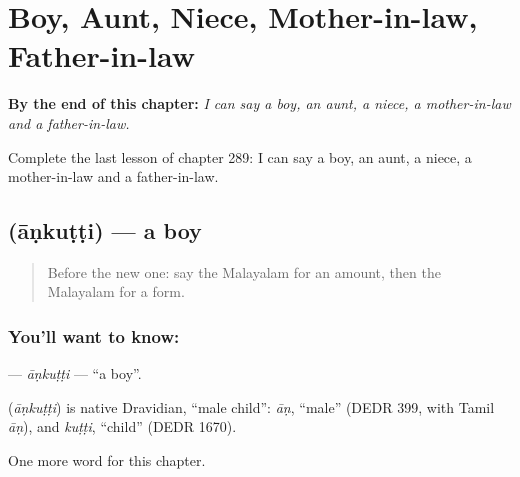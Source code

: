
\chapter{Boy, Aunt, Niece, Mother-in-law, Father-in-law}
\label{ch:ml-boy-aunt-niece-mother-in-law-father-in-law}

\begin{chapteropening}
\textbf{By the end of this chapter:} \emph{I can say a boy, an aunt, a niece, a mother-in-law and a father-in-law.}

Complete the last lesson of chapter 289: I can say a boy, an aunt, a niece, a mother-in-law and a father-in-law.
\end{chapteropening}

\section[\texorpdfstring{\ml{ആൺകുട്ടി} (āṇkuṭṭi)}{ആൺകുട്ടി (āṇkuṭṭi)}]{ (āṇkuṭṭi) — a boy}

\label{lesson:ML-C289-ankutti}



\begin{quote}
Before the new one: say the Malayalam for an amount, then the Malayalam for a form.
\end{quote}

\subsection*{You'll want to know: }
\textbf{} — \emph{āṇkuṭṭi} — \textquotedblleft{}a boy\textquotedblright{}.

\begin{cousinweb}
\textbf{} (\emph{āṇkuṭṭi}) is native Dravidian, \textquotedblleft{}male child\textquotedblright{}: \emph{āṇ}, \textquotedblleft{}male\textquotedblright{} (DEDR 399, with Tamil \emph{āṇ}), and \emph{kuṭṭi}, \textquotedblleft{}child\textquotedblright{} (DEDR 1670).
\end{cousinweb}

\begin{grammarlens}[title={What you've built}]
One more word for this chapter.
\end{grammarlens}

